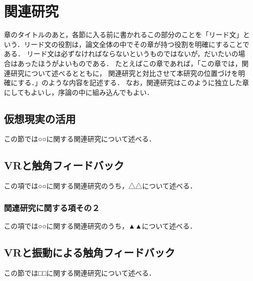 \chapter{関連研究}	%
\thispagestyle{plain}   %

章のタイトルのあと，各節に入る前に書かれるこの部分のことを「リード文」という．リード文の役割は，論文全体の中でその章が持つ役割を明確にすることである．
リード文は必ずなければならないというものではないが，だいたいの場合はあったほうがよいものである．
たとえばこの章であれば，「この章では，関連研究について述べるとともに，
関連研究と対比させて本研究の位置づけを明確にする．」のような内容を記述する．
なお，関連研究はこのように独立した章にしてもよいし，序論の中に組み込んでもよい．

\section{仮想現実の活用}
この節では○○に関する関連研究について述べる．

\section{VRと触角フィードバック}
この項では○○に関する関連研究のうち，△△について述べる．

\subsection{関連研究に関する項その２}
この項では○○に関する関連研究のうち，▲▲について述べる．

\section{VRと振動による触角フィードバック}
この節では□□に関する関連研究について述べる．


